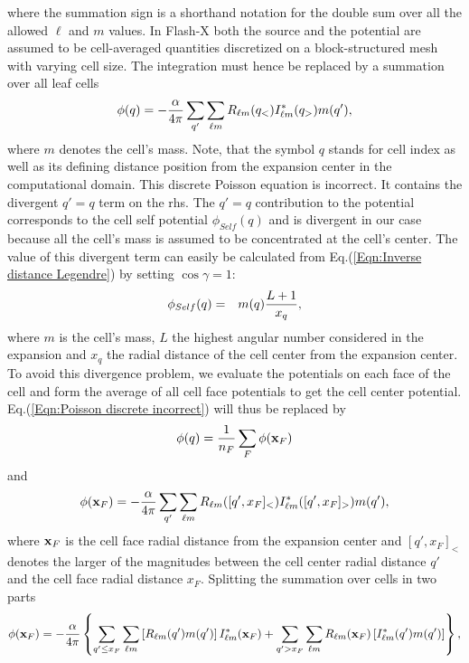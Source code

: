where the summation sign is a shorthand notation for the double sum over all the
allowed $\ell$ and $m$ values. In Flash-X both the source and the potential are
assumed to be cell-averaged quantities discretized on a block-structured mesh with
varying cell size. The integration must hence be replaced by a summation over all 
leaf cells
\begin{equation}
\label{Eqn:Poisson discrete incorrect}
\phi(q) = -{\alpha\over 4\pi}
\sum_{q'} \sum_{\ell m}R_{\ell m}(q_<)I_{\ell m}^*(q_>)m(q'),
\end{equation}
where $m$ denotes the cell's mass. Note, that the symbol $q$ stands for cell index as well
as its defining distance position from the expansion center in the computational domain.
This discrete Poisson equation is incorrect. It contains the divergent $q'=q$ term on
the rhs. The $q'=q$ contribution to the potential corresponds to the cell self potential
$\phi_{Self}(q)$ and is divergent in our case because all the cell's mass is assumed to be
concentrated at the cell's center. The value of this divergent term can easily be calculated
from Eq.(\ref{Eqn:Inverse distance Legendre}) by setting $\cos\gamma = 1$:
\begin{eqnarray}
\phi_{Self}(q) & = &  m(q){L+1\over x_q},
\end{eqnarray}
where $m$ is the cell's mass, $L$ the highest angular number considered in the expansion
and $x_q$ the radial distance of the cell center from the expansion center. To avoid this divergence
problem, we evaluate the potentials on each face of the cell and form the average of all
cell face potentials to get the cell center potential. Eq.(\ref{Eqn:Poisson discrete incorrect})
will thus be replaced by
\begin{equation}
\phi(q) = {1\over n_F} \sum_{F} \phi({\bf x}_F)
\end{equation}
and
\begin{equation}
\label{Eqn:Poisson discrete correct}
\phi({\bf x}_F) = -{\alpha\over 4\pi}
\sum_{q'} \sum_{\ell m}R_{\ell m}([q',x_F]_<)I_{\ell m}^*([q',x_F]_>)m(q'),
\end{equation}
where ${\bf x}_F$ is the cell face radial distance from the expansion center and $[q',x_F]_<$ denotes the
larger of the magnitudes between the cell center radial distance $q'$ and the cell face radial distance $x_F$.
Splitting the summation over cells in two parts
\begin{equation}
\label{Eqn:Poisson discrete correct 1}
\phi({\bf x}_F) = -{\alpha\over 4\pi}\left\{
\sum_{q'\leq x_F} \sum_{\ell m}\left[R_{\ell m}(q')m(q')\right]I_{\ell m}^*({\bf x}_F)
+ \sum_{q'>x_F} \sum_{\ell m}R_{\ell m}({\bf x}_F)\left[I_{\ell m}^*(q')m(q')\right]\right\},
\end{equation}

